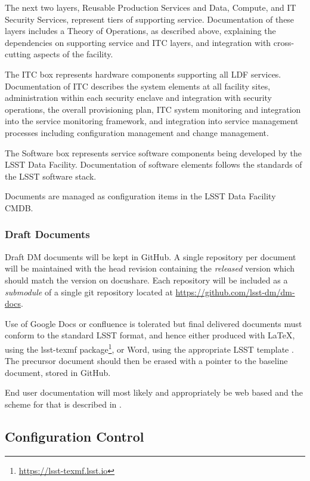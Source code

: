 The next two layers, Reusable Production Services and Data, Compute, and IT Security Services, represent tiers of supporting service. Documentation of these layers includes a Theory of Operations, as described above, explaining the dependencies on supporting service and ITC layers, and integration with cross-cutting aspects of the facility.

The ITC box represents hardware components supporting all LDF services. Documentation of ITC describes the system elements at all facility sites, administration within each security enclave and integration with security operations, the overall provisioning plan, ITC system monitoring and integration into the service monitoring framework, and integration into service management processes including configuration management and change management.

The Software box represents service software components being developed by the LSST Data Facility. Documentation of software elements follows the standards of the LSST software stack.

Documents are managed as configuration items in the LSST Data Facility CMDB.

\subsubsection{Draft Documents}

Draft DM documents will be kept in GitHub. A single repository per document will be maintained with the head revision containing the {\em released } version which should match the version on docushare. Each repository will be included as a {\em submodule} of a single git repository located at \url{https://github.com/lsst-dm/dm-docs}.

Use of Google Docs or confluence is tolerated but final delivered documents must conform to the standard LSST format, and hence either produced with LaTeX, using the lsst-texmf package\footnote{\url{https://lsst-texmf.lsst.io}}, or Word, using the appropriate LSST template . The precursor document should then be erased with a pointer to the baseline document, stored in GitHub.

End user documentation will most likely and appropriately be web based and the scheme for that is described in .

\subsection {Configuration Control} \label{sect:config}

